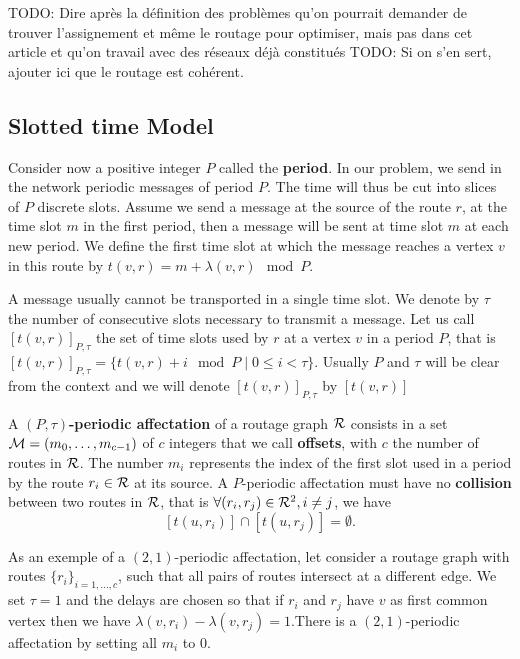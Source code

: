 \documentclass[a4paper,10pt]{article}
\newcommand{\todo}[1]{{\color{red} TODO: {#1}}}
\begin{document}
     \todo{Dire après  la définition des problèmes qu'on pourrait demander de trouver l'assignement et même le routage pour optimiser, mais pas dans cet article
     et qu'on travail avec des réseaux déjà constitués}
      \todo{Si on s'en sert, ajouter ici que le routage est cohérent.}

   \subsection{Slotted time Model}
      Consider now a positive integer $P$ called the {\bf period}. In our problem, we send in the network
      periodic messages of period $P$. The time will thus be cut into slices of $P$ discrete slots. Assume we send a message at the source of the route $r$, at the time slot $m$ in the first period, then a message will be sent at time slot $m$ at each new period. We define the first time slot at which the message reaches a vertex $v$ in this route by $t(v,r) = m + \lambda(v,r) \mod P$. 

      A message usually cannot be transported in a single time slot. We denote by $\tau$ the number 
      of consecutive slots necessary to transmit a message. Let us call $[t(v,r)]_{P,\tau}$ the set of time slots used by $r$ at a vertex $v$ in a period $P$, that is $[t(v,r)]_{P,\tau} = \{t(v,r) + i \mod P \mid 0 \leq i < \tau \}$. Usually $P$ and $\tau$ will be clear from the context and we will denote $[t(v,r)]_{P,\tau}$ by $[t(v,r)]$
      
      
      A {\bf $(P,\tau)$-periodic affectation} of a routage graph $\cal R$ consists in a set  ${\cal M}=(m_0, \ldots ,m_{c-1})$ of $c$ integers that we call {\bf offsets}, with $c$ the number of routes in $\cal R$. The number $m_i$ represents the index of the first slot used in a period  by the route $r_i \in {\cal R}$ at its source.
      A $P$-periodic affectation must have no {\bf collision} between two routes in ${\cal R}$, that is $\forall (r_i, r_j) \in {\cal R}^2, i \neq j$, %
      we have $$[t(u,r_i)] \cap [t(u,r_j)] = \emptyset .$$
      

      As an exemple of a $(2,1)$-periodic affectation, let consider a routage graph with routes $\{r_i\}_{i=1,\dots,c}$, such that all pairs of routes intersect at a different edge.
      We set $\tau = 1$ and the delays are chosen so that if $r_i$ and $r_j$ have $v$ as first common vertex then we have $\lambda(v,r_i) - \lambda(v,r_j)=1$.There is a $(2,1)$-periodic affectation by setting all $m_i$ to $0$.
\end{document}
